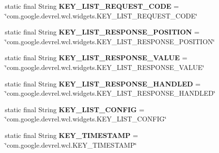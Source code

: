 \begin{DoxyCompactItemize}
\item 
static final String {\bfseries K\+E\+Y\+\_\+\+L\+I\+S\+T\+\_\+\+R\+E\+Q\+U\+E\+S\+T\+\_\+\+C\+O\+DE} = \char`\"{}com.\+google.\+devrel.\+wcl.\+widgets.\+K\+E\+Y\+\_\+\+L\+I\+S\+T\+\_\+\+R\+E\+Q\+U\+E\+S\+T\+\_\+\+C\+O\+DE\char`\"{}\hypertarget{classcom_1_1google_1_1devrel_1_1wcl_1_1Constants_acebf4943b05532f883d90f8ef1db18da}{}\label{classcom_1_1google_1_1devrel_1_1wcl_1_1Constants_acebf4943b05532f883d90f8ef1db18da}

\item 
static final String {\bfseries K\+E\+Y\+\_\+\+L\+I\+S\+T\+\_\+\+R\+E\+S\+P\+O\+N\+S\+E\+\_\+\+P\+O\+S\+I\+T\+I\+ON} = \char`\"{}com.\+google.\+devrel.\+wcl.\+widgets.\+K\+E\+Y\+\_\+\+L\+I\+S\+T\+\_\+\+R\+E\+S\+P\+O\+N\+S\+E\+\_\+\+P\+O\+S\+I\+T\+I\+ON\char`\"{}\hypertarget{classcom_1_1google_1_1devrel_1_1wcl_1_1Constants_a422e61291c753b0cb21fb1ec7b16c5e8}{}\label{classcom_1_1google_1_1devrel_1_1wcl_1_1Constants_a422e61291c753b0cb21fb1ec7b16c5e8}

\item 
static final String {\bfseries K\+E\+Y\+\_\+\+L\+I\+S\+T\+\_\+\+R\+E\+S\+P\+O\+N\+S\+E\+\_\+\+V\+A\+L\+UE} = \char`\"{}com.\+google.\+devrel.\+wcl.\+widgets.\+K\+E\+Y\+\_\+\+L\+I\+S\+T\+\_\+\+R\+E\+S\+P\+O\+N\+S\+E\+\_\+\+V\+A\+L\+UE\char`\"{}\hypertarget{classcom_1_1google_1_1devrel_1_1wcl_1_1Constants_aed6565ea0622585c23f1a88bea1027d4}{}\label{classcom_1_1google_1_1devrel_1_1wcl_1_1Constants_aed6565ea0622585c23f1a88bea1027d4}

\item 
static final String {\bfseries K\+E\+Y\+\_\+\+L\+I\+S\+T\+\_\+\+R\+E\+S\+P\+O\+N\+S\+E\+\_\+\+H\+A\+N\+D\+L\+ED} = \char`\"{}com.\+google.\+devrel.\+wcl.\+widgets.\+K\+E\+Y\+\_\+\+L\+I\+S\+T\+\_\+\+R\+E\+S\+P\+O\+N\+S\+E\+\_\+\+H\+A\+N\+D\+L\+ED\char`\"{}\hypertarget{classcom_1_1google_1_1devrel_1_1wcl_1_1Constants_a4f5cb2413fb3d904e261c5cdb19b14e8}{}\label{classcom_1_1google_1_1devrel_1_1wcl_1_1Constants_a4f5cb2413fb3d904e261c5cdb19b14e8}

\item 
static final String {\bfseries K\+E\+Y\+\_\+\+L\+I\+S\+T\+\_\+\+C\+O\+N\+F\+IG} = \char`\"{}com.\+google.\+devrel.\+wcl.\+widgets.\+K\+E\+Y\+\_\+\+L\+I\+S\+T\+\_\+\+C\+O\+N\+F\+IG\char`\"{}\hypertarget{classcom_1_1google_1_1devrel_1_1wcl_1_1Constants_a019341941e63e11b657d2e4e6e7088b1}{}\label{classcom_1_1google_1_1devrel_1_1wcl_1_1Constants_a019341941e63e11b657d2e4e6e7088b1}

\item 
static final String {\bfseries K\+E\+Y\+\_\+\+T\+I\+M\+E\+S\+T\+A\+MP} = \char`\"{}com.\+google.\+devrel.\+wcl.\+K\+E\+Y\+\_\+\+T\+I\+M\+E\+S\+T\+A\+MP\char`\"{}\hypertarget{classcom_1_1google_1_1devrel_1_1wcl_1_1Constants_a053034568d22bee5947ecded5f026ce3}{}\label{classcom_1_1google_1_1devrel_1_1wcl_1_1Constants_a053034568d22bee5947ecded5f026ce3}

\end{DoxyCompactItemize}



